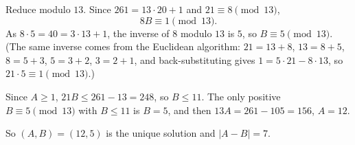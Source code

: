 Reduce modulo $13$. Since $261=13\cdot20+1$ and $21\equiv8\pmod{13}$,
\[8B\equiv1\pmod{13}.\]
As $8\cdot5=40=3\cdot13+1$, the inverse of $8$ modulo $13$ is $5$, so $B\equiv5\pmod{13}$. (The same inverse comes from the Euclidean algorithm: $21=13+8$, $13=8+5$, $8=5+3$, $5=3+2$, $3=2+1$, and back-substituting gives $1=5\cdot21-8\cdot13$, so $21\cdot5\equiv1\pmod{13}$.)

Since $A\ge1$, $21B\le261-13=248$, so $B\le11$. The only positive $B\equiv5\pmod{13}$ with $B\le11$ is $B=5$, and then $13A=261-105=156$, $A=12$.

So $(A,B)=(12,5)$ is the unique solution and $|A-B|=\boxed{7}$.
